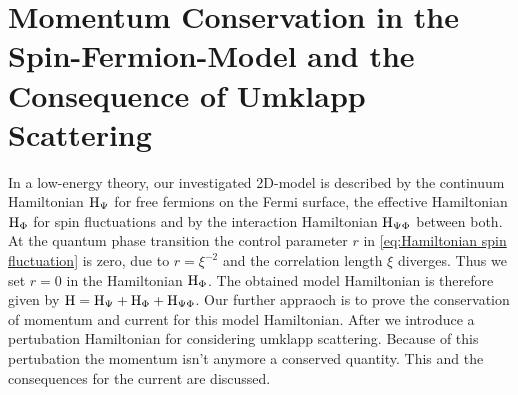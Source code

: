 \section{Momentum Conservation in the Spin-Fermion-Model and the Consequence of Umklapp Scattering}
\label{sec:umklapp scattering}
%
%
In a low-energy theory, our investigated 2D-model is described by the continuum Hamiltonian $\mathrm{H}_{\Psi}$ for free fermions on the Fermi surface, the effective Hamiltonian $\mathrm{H}_{\Phi}$ for spin fluctuations and by the interaction Hamiltonian $\mathrm{H}_{\Psi\Phi}$ between both.
At the quantum phase transition the control parameter $r$ in \eqref{eq:Hamiltonian spin fluctuation} is zero, due to $r = \xi^{-2}$ and the correlation length $\xi$ diverges.
Thus we set $r = 0$ in the Hamiltonian $\mathrm{H}_{\Phi}$.
The obtained model Hamiltonian is therefore given by $\mathrm{H} = \mathrm{H}_{\Psi} + \mathrm{H}_{\Phi} + \mathrm{H}_{\Psi\Phi}$.
Our further appraoch is to prove the conservation of momentum and current for this model Hamiltonian.
After we introduce a pertubation Hamiltonian for considering umklapp scattering.
Because of this pertubation the momentum isn't anymore a conserved quantity. 
This and the consequences for the current are discussed.


